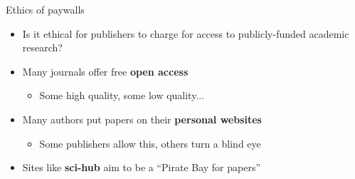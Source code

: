 \begin{frame}{Ethics of paywalls}
	\begin{itemize}
		\pause\item Is it ethical for publishers to charge for access to publicly-funded academic research?
		\pause\item Many journals offer free \textbf{open access}
			\begin{itemize}
				\pause\item Some high quality, some low quality...
			\end{itemize}
		\pause\item Many authors put papers on their \textbf{personal websites}
			\begin{itemize}
				\pause\item Some publishers allow this, others turn a blind eye
			\end{itemize}
		\pause\item Sites like \textbf{sci-hub} aim to be a ``Pirate Bay for papers''
	\end{itemize}
\end{frame}
